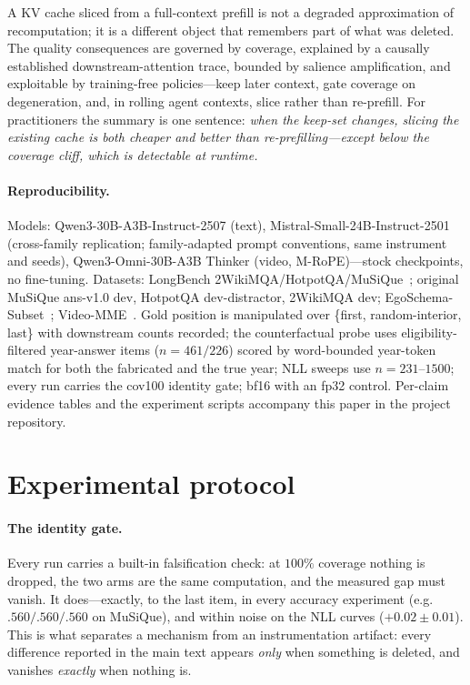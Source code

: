 \documentclass{article} %
\begin{document}
A KV cache sliced from a full-context prefill is not a degraded approximation of recomputation; it is a different object that remembers part of what was deleted. The quality consequences are governed by coverage, explained by a causally established downstream-attention trace, bounded by salience amplification, and exploitable by training-free policies---keep later context, gate coverage on degeneration, and, in rolling agent contexts, slice rather than re-prefill. For practitioners the summary is one sentence: \emph{when the keep-set changes, slicing the existing cache is both cheaper and better than re-prefilling---except below the coverage cliff, which is detectable at runtime.}

\paragraph{Reproducibility.}
Models: Qwen3-30B-A3B-Instruct-2507 (text), Mistral-Small-24B-Instruct-2501 (cross-family replication; family-adapted prompt conventions, same instrument and seeds), Qwen3-Omni-30B-A3B Thinker (video, M-RoPE)---stock checkpoints, no fine-tuning. Datasets: LongBench 2WikiMQA/HotpotQA/MuSiQue~\citep{longbench,musique,hotpotqa,twowiki}; original MuSiQue ans-v1.0 dev, HotpotQA dev-distractor, 2WikiMQA dev; EgoSchema-Subset~\citep{egoschema}; Video-MME~\citep{videomme}. Gold position is manipulated over \{first, random-interior, last\} with downstream counts recorded; the counterfactual probe uses eligibility-filtered year-answer items ($n=461/226$) scored by word-bounded year-token match for both the fabricated and the true year; NLL sweeps use $n=231$--$1500$; every run carries the cov100 identity gate; bf16 with an fp32 control. Per-claim evidence tables and the experiment scripts accompany this paper in the project repository.

\appendix

\section{Experimental protocol}
\label{app:protocol}

\paragraph{The identity gate.}
Every run carries a built-in falsification check: at $100\%$ coverage nothing is dropped, the two arms are the same computation, and the measured gap must vanish. It does---exactly, to the last item, in every accuracy experiment (e.g.\ $.560/.560/.560$ on MuSiQue), and within noise on the NLL curves ($+0.02\pm0.01$). This is what separates a mechanism from an instrumentation artifact: every difference reported in the main text appears \emph{only} when something is deleted, and vanishes \emph{exactly} when nothing is.
\end{document}
